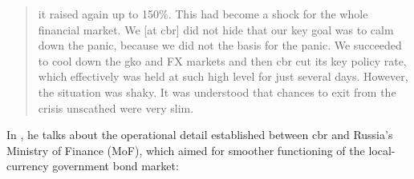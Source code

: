 \begin{quote}
it raised again up to 150\%. This had become a shock for the whole financial market. We [at \ac{cbr}] did not hide that our key goal was to calm down the panic, because we did not the basis for the panic. We succeeded to cool down the \ac{gko} and FX markets and then \ac{cbr} cut its key policy rate, which effectively was held at such high level for just several days. However, the situation was shaky. It was understood that chances to exit from the crisis unscathed were very slim.
\end{quote}

In \citep{aleksash2018_2}, he talks about the operational detail established between \acf{cbr} and Russia's Ministry of Finance (MoF), which aimed for smoother functioning of the local-currency government bond market:

\begin{quote}

\end{quote}
